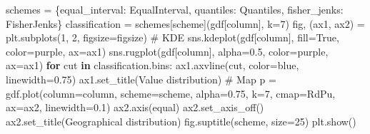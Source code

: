 \documentclass[
  letterpaper,
  DIV=11,
  numbers=noendperiod]{scrreprt}
\newenvironment{Shaded}{\begin{snugshade}}{\end{snugshade}}
\newcommand{\CommentTok}[1]{\textcolor[rgb]{0.37,0.37,0.37}{#1}}
\newcommand{\ControlFlowTok}[1]{\textcolor[rgb]{0.00,0.23,0.31}{\textbf{#1}}}
\newcommand{\DecValTok}[1]{\textcolor[rgb]{0.68,0.00,0.00}{#1}}
\newcommand{\FloatTok}[1]{\textcolor[rgb]{0.68,0.00,0.00}{#1}}
\newcommand{\KeywordTok}[1]{\textcolor[rgb]{0.00,0.23,0.31}{\textbf{#1}}}
\newcommand{\NormalTok}[1]{\textcolor[rgb]{0.00,0.23,0.31}{#1}}
\newcommand{\OperatorTok}[1]{\textcolor[rgb]{0.37,0.37,0.37}{#1}}
\newcommand{\StringTok}[1]{\textcolor[rgb]{0.13,0.47,0.30}{#1}}
\newcommand{\VariableTok}[1]{\textcolor[rgb]{0.07,0.07,0.07}{#1}}
\begin{document}
\begin{Shaded}
\begin{Highlighting}[]
\CommentTok{    \textquotesingle{}\textquotesingle{}\textquotesingle{}}
\NormalTok{    schemes }\OperatorTok{=}\NormalTok{ \{}\StringTok{\textquotesingle{}equal\_interval\textquotesingle{}}\NormalTok{: EqualInterval, }\StringTok{\textquotesingle{}quantiles\textquotesingle{}}\NormalTok{: Quantiles, }\StringTok{\textquotesingle{}fisher\_jenks\textquotesingle{}}\NormalTok{: FisherJenks\} }
\NormalTok{    classification }\OperatorTok{=}\NormalTok{ schemes[scheme](gdf[column], k}\OperatorTok{=}\DecValTok{7}\NormalTok{)}
\NormalTok{    fig, (ax1, ax2) }\OperatorTok{=}\NormalTok{ plt.subplots(}\DecValTok{1}\NormalTok{, }\DecValTok{2}\NormalTok{, figsize}\OperatorTok{=}\NormalTok{figsize)}
    \CommentTok{\# KDE}
\NormalTok{    sns.kdeplot(gdf[column], fill}\OperatorTok{=}\VariableTok{True}\NormalTok{, color}\OperatorTok{=}\StringTok{\textquotesingle{}purple\textquotesingle{}}\NormalTok{, ax}\OperatorTok{=}\NormalTok{ax1)}
\NormalTok{    sns.rugplot(gdf[column], alpha}\OperatorTok{=}\FloatTok{0.5}\NormalTok{, color}\OperatorTok{=}\StringTok{\textquotesingle{}purple\textquotesingle{}}\NormalTok{, ax}\OperatorTok{=}\NormalTok{ax1)}
    \ControlFlowTok{for}\NormalTok{ cut }\KeywordTok{in}\NormalTok{ classification.bins:}
\NormalTok{        ax1.axvline(cut, color}\OperatorTok{=}\StringTok{\textquotesingle{}blue\textquotesingle{}}\NormalTok{, linewidth}\OperatorTok{=}\FloatTok{0.75}\NormalTok{)}
\NormalTok{    ax1.set\_title(}\StringTok{\textquotesingle{}Value distribution\textquotesingle{}}\NormalTok{)}
    \CommentTok{\# Map}
\NormalTok{    p }\OperatorTok{=}\NormalTok{ gdf.plot(column}\OperatorTok{=}\NormalTok{column, scheme}\OperatorTok{=}\NormalTok{scheme, alpha}\OperatorTok{=}\FloatTok{0.75}\NormalTok{, k}\OperatorTok{=}\DecValTok{7}\NormalTok{, cmap}\OperatorTok{=}\StringTok{\textquotesingle{}RdPu\textquotesingle{}}\NormalTok{, ax}\OperatorTok{=}\NormalTok{ax2, linewidth}\OperatorTok{=}\FloatTok{0.1}\NormalTok{)}
\NormalTok{    ax2.axis(}\StringTok{\textquotesingle{}equal\textquotesingle{}}\NormalTok{)}
\NormalTok{    ax2.set\_axis\_off()}
\NormalTok{    ax2.set\_title(}\StringTok{\textquotesingle{}Geographical distribution\textquotesingle{}}\NormalTok{)}
\NormalTok{    fig.suptitle(scheme, size}\OperatorTok{=}\DecValTok{25}\NormalTok{)}
\NormalTok{    plt.show()}
\end{Highlighting}
\end{Shaded}
\end{document}
